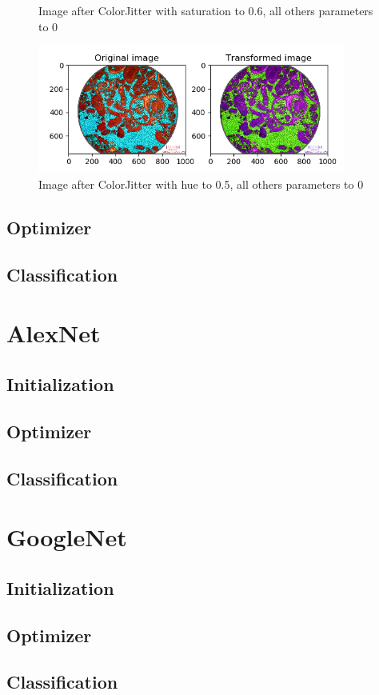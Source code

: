 \begin{figure}
\begin{minipage}{0.4\textwidth}
        \caption{Image after ColorJitter with saturation to 0.6, all others parameters to 0}\label{fig:litandstruc}
    \end{minipage}
    \begin{minipage}{0.4\textwidth}
        \centering
        \includegraphics[width=0.9\textwidth]{figures/03-hue05.PNG} %
        \caption{Image after ColorJitter with hue to 0.5, all others parameters to 0}\label{fig:litandstruc}
    \end{minipage}
\end{figure}

\subsection{Optimizer}
\subsection{Classification}
\section{AlexNet}\label{sec:aleX}
\subsection{Initialization}
\subsection{Optimizer}
\subsection{Classification}
\section{GoogleNet}\label{sec:gogl}
\subsection{Initialization}
\subsection{Optimizer}
\subsection{Classification}